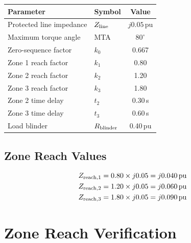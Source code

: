 \documentclass[11pt, a4paper]{article}
\begin{document}
\begin{center}
\begin{tabular}{llc}
  \toprule
  Parameter & Symbol & Value \\
  \midrule
  Protected line impedance & $Z_{\rm line}$ & $j0.05$\,pu \\
  Maximum torque angle     & MTA            & $80^\circ$ \\
  Zero-sequence factor     & $k_0$          & 0.667 \\
  Zone 1 reach factor      & $k_1$          & 0.80 \\
  Zone 2 reach factor      & $k_2$          & 1.20 \\
  Zone 3 reach factor      & $k_3$          & 1.80 \\
  Zone 2 time delay        & $t_2$          & 0.30\,s \\
  Zone 3 time delay        & $t_3$          & 0.60\,s \\
  Load blinder             & $R_{\rm blinder}$ & 0.40\,pu \\
  \bottomrule
\end{tabular}
\end{center}

\subsection{Zone Reach Values}

\begin{align}
  Z_{\rm reach,1} &= 0.80 \times j0.05 = j0.040\,\text{pu} \\
  Z_{\rm reach,2} &= 1.20 \times j0.05 = j0.060\,\text{pu} \\
  Z_{\rm reach,3} &= 1.80 \times j0.05 = j0.090\,\text{pu}
\end{align}


\section{Zone Reach Verification}
\label{sec:zones}
\end{document}
